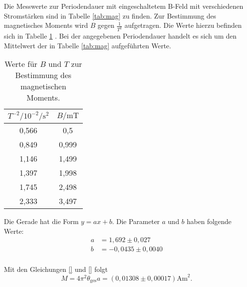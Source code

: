 Die Messwerte zur Periodendauer mit eingeschaltetem B-Feld mit verschiedenen Stromstärken sind in Tabelle \ref{tab:mag} zu finden.
Zur Bestimmung des magnetisches Moments wird $B$ gegen $\frac{1}{T^2}$ aufgetragen. Die Werte hierzu befinden sich in Tabelle \ref{tab:mag2} . Bei der angegebenen Periodendauer handelt es sich um den Mittelwert der in Tabelle \ref{tab:mag} aufgeführten Werte.

\begin{table}
  \caption{Werte für $B$ und $T$ zur Bestimmung des magnetischen Moments.}
  \centering
  \label{tab:mag2}
  \begin{tabular}{c c }
    \toprule
    $T^{-2} / 10^{-2} {\si{\per\second\squared}}$ & $B/ \si{\milli\tesla}$ \\
    \midrule
    0,566 & 0,5 \\
    0,849 & 0,999 \\
    1,146 & 1,499 \\
    1,397 & 1,998 \\
    1,745 & 2,498 \\
    2,333 & 3,497 \\
    \bottomrule
    \end{tabular}
\end{table}


Die Gerade hat die Form $y=ax+b$. Die Parameter $a$ und $b$ haben folgende Werte:
\begin{align}
  a&=1,692 \pm 0,027 \\
  b&= -0,0435 \pm 0,0040 \\
\end{align}

Mit den Gleichungen \ref{} und \ref{} folgt
\begin{equation}
  M = 4\pi^2 \theta_\mathrm{ges} a = (0,01308 \pm 0,00017) \si{\ampere \meter}^2.
\end{equation}
